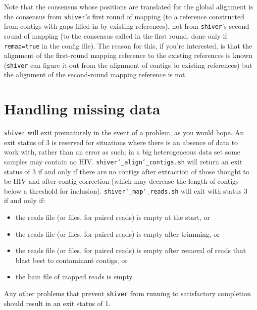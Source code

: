\documentclass{article}
\newcommand{\shiv}{\c{shiver}\xspace}
\newcommand{\sac}{\c{shiver\char`_align\char`_contigs.sh}\xspace}
\newcommand{\smr}{\c{shiver\char`_map\char`_reads.sh}\xspace}
\let\c\texttt
\begin{document}
Note that the consensus whose positions are translated for the global alignment is the consensus from \shiv's first round of mapping (to a reference constructed from contigs with gaps filled in by existing references), not from \shiv's second round of mapping (to the consensus called in the first round; done only if \c{remap=true} in the config file).
The reason for this, if you're interested, is that the alignment of the first-round mapping reference to the existing references is known (\shiv can figure it out from the alignment of contigs to existing references) but the alignment of the second-round mapping reference is not.

\section{Handling missing data} \label{sec:ContiglessSamples}

\shiv will exit prematurely in the event of a problem, as you would hope.
An exit status of 3 is reserved for situations where there is an absence of data to work with, rather than an error as such; in a big heterogeneous data set some samples may contain no HIV.
\sac will return an exit status of 3 if and only if there are no contigs after extraction of those thought to be HIV and after contig correction (which may decrease the length of contigs below a threshold for inclusion).
\smr will exit with status 3 if and only if:
\begin{itemize}
\item the reads file (or files, for paired reads) is empty at the start, or
\item the reads file (or files, for paired reads) is empty after trimming, or
\item the reads file (or files, for paired reads) is empty after removal of reads that blast best to contaminant contigs, or
\item the bam file of mapped reads is empty.
\end{itemize}
Any other problems that prevent \shiv from running to satisfactory completion should result in an exit status of 1.
\end{document}
